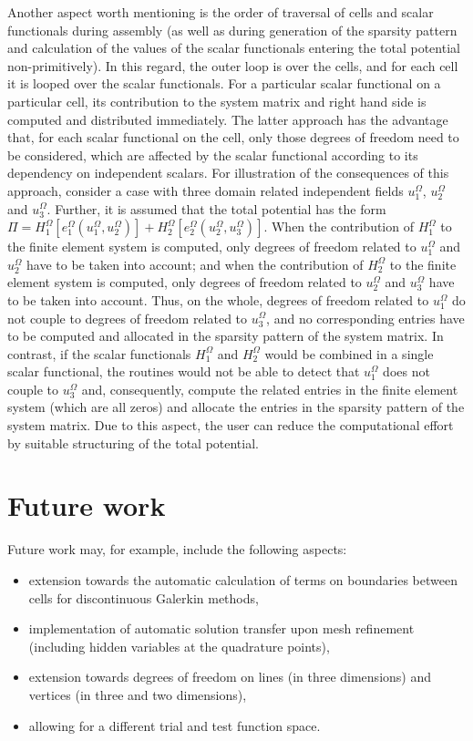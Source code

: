 \documentclass[pdftex,a4paper,12pt,abstracton]{scrartcl}
\begin{document}
Another aspect worth mentioning is the order of traversal of cells and scalar functionals during assembly (as well as during generation of the sparsity pattern and calculation of the values of the scalar functionals entering the total potential non-primitively). In this regard, the outer loop is over the cells, and for each cell it is looped over the scalar functionals. For a particular scalar functional on a particular cell, its contribution to the system matrix and right hand side is computed and distributed immediately. The latter approach has the advantage that, for each scalar functional on the cell, only those degrees of freedom need to be considered, which are affected by the scalar functional according to its dependency on independent scalars. For illustration of the consequences of this approach, consider a case with three domain related independent fields $u^\Omega_1$, $u^\Omega_2$ and $u^\Omega_3$. Further, it is assumed that the total potential has the form $\Pi =H^\Omega_1[e^\Omega_1(u^\Omega_1, u^\Omega_2)] + H^\Omega_2[e^\Omega_2(u^\Omega_2, u^\Omega_3)]$. When the contribution of $H^\Omega_1$ to the finite element system is computed, only degrees of freedom related to $u^\Omega_1$ and $u^\Omega_2$ have to be taken into account; and when the contribution of $H^\Omega_2$ to the finite element system is computed, only degrees of freedom related to $u^\Omega_2$ and $u^\Omega_3$ have to be taken into account. Thus, on the whole, degrees of freedom related to $u^\Omega_1$ do not couple to degrees of freedom related to $u^\Omega_3$, and no corresponding entries have to be computed and allocated in the sparsity pattern of the system matrix. In contrast, if the scalar functionals $H^\Omega_1$ and $H^\Omega_2$ would be combined in a single scalar functional, the routines would not be able to detect that $u^\Omega_1$ does not couple to $u^\Omega_3$ and, consequently, compute the related entries in the finite element system (which are all zeros) and allocate the entries in the sparsity pattern of the system matrix. Due to this aspect, the user can reduce the computational effort by suitable structuring of the total potential.

\section{Future work}
Future work may, for example, include the following aspects:
\begin{itemize}
 \item extension towards the automatic calculation of terms on boundaries between cells for discontinuous Galerkin methods,
 \item implementation of automatic solution transfer upon mesh refinement (including hidden variables at the quadrature points),
 \item extension towards degrees of freedom on lines (in three dimensions) and vertices (in three and two dimensions),
 \item allowing for a different trial and test function space.
\end{itemize}





\end{document}
